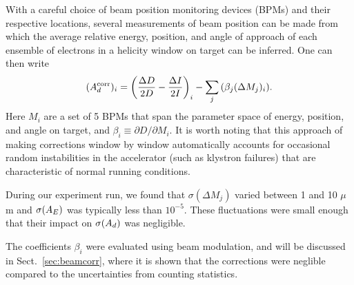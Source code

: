 With a careful choice of beam position monitoring devices (BPMs) 
and their respective locations, several measurements of beam
position can be made from which the average relative energy,
position, and angle of approach of each ensemble of electrons in a
helicity window on target can be inferred. One can then write
\begin{equation} 
(A^{\rm corr}_d)_i = \left(\frac{\Delta D}{2D} - \frac{\Delta I}{2I}\right)_i
-\sum_j{\left({\beta_j(\Delta M_j)_i}\right)}.
\end{equation}
Here $M_i$ are a set of 5 BPMs that span the parameter space of
energy, position, and angle on target, and $\beta_i \equiv \partial
D/\partial M_i$. It is worth noting that this approach of making
corrections window by window automatically accounts for occasional
random instabilities in the accelerator (such as klystron
failures) that are characteristic of normal running conditions.

During our experiment run, we found that $\sigma(\Delta M_j)$ varied
between 1 and 10 $\mu$m and $\sigma (A_E)$ was typically less
than $10^{-5}$. These fluctuations were small enough that their
impact on $\sigma (A_d)$ was negligible. 

The coefficients $\beta_i$ were evaluated using beam modulation, and will be
discussed in Sect.~\ref{sec:beamcorr}, where it is shown that the 
corrections were neglible compared to the uncertainties from counting statistics.




